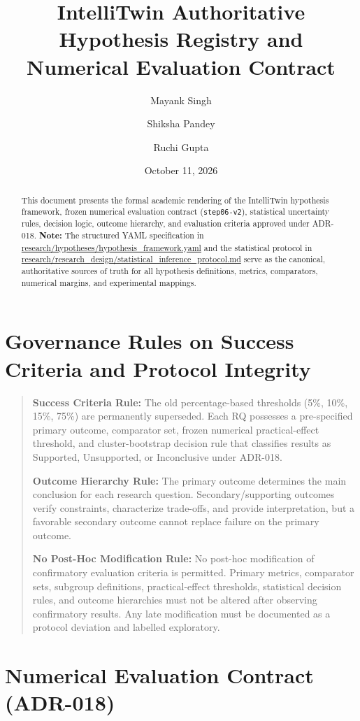 \documentclass{article}
\title{IntelliTwin Authoritative Hypothesis Registry and Numerical Evaluation Contract}
\author{Mayank Singh \and Shiksha Pandey \and Ruchi Gupta}
\date{October 11, 2026}
\begin{document}
\maketitle

\begin{abstract}
This document presents the formal academic rendering of the IntelliTwin hypothesis framework, frozen numerical evaluation contract (\texttt{step06-v2}), statistical uncertainty rules, decision logic, outcome hierarchy, and evaluation criteria approved under ADR-018.
\textbf{Note:} The structured YAML specification in \url{research/hypotheses/hypothesis_framework.yaml} and the statistical protocol in \url{research/research_design/statistical_inference_protocol.md} serve as the canonical, authoritative sources of truth for all hypothesis definitions, metrics, comparators, numerical margins, and experimental mappings.
\end{abstract}

\section*{Governance Rules on Success Criteria and Protocol Integrity}

\begin{quote}
\textbf{Success Criteria Rule:} The old percentage-based thresholds (5\%, 10\%, 15\%, 75\%) are permanently superseded. Each RQ possesses a pre-specified primary outcome, comparator set, frozen numerical practical-effect threshold, and cluster-bootstrap decision rule that classifies results as Supported, Unsupported, or Inconclusive under ADR-018.

\textbf{Outcome Hierarchy Rule:} The primary outcome determines the main conclusion for each research question. Secondary/supporting outcomes verify constraints, characterize trade-offs, and provide interpretation, but a favorable secondary outcome cannot replace failure on the primary outcome.

\textbf{No Post-Hoc Modification Rule:} No post-hoc modification of confirmatory evaluation criteria is permitted. Primary metrics, comparator sets, subgroup definitions, practical-effect thresholds, statistical decision rules, and outcome hierarchies must not be altered after observing confirmatory results. Any late modification must be documented as a protocol deviation and labelled exploratory.
\end{quote}

\section*{Numerical Evaluation Contract (ADR-018)}
\end{document}
